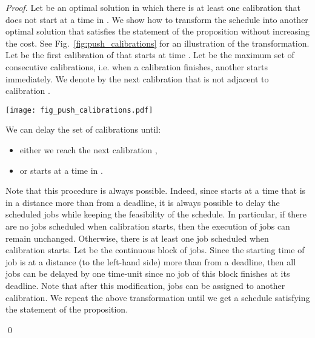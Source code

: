 \begin{proof}
Let  be an optimal solution in which there is at least one calibration that does not start at a time in .
We show how to transform the schedule  into another optimal
solution that satisfies the statement of the proposition without increasing the cost.
See Fig.~\ref{fig:push_calibrations} for an illustration of the transformation.
Let  be the first calibration of   that starts at
time .
Let  be the maximum set of consecutive calibrations, i.e.
when a calibration finishes, another starts immediately.
We denote by  the next calibration that is not adjacent to calibration .
\begin{figure*}[ht]
\centering
\texttt{[image: fig\_push\_calibrations.pdf]}
\caption{Illustration of Proposition~\ref{prop:position_calibration}. The first schedule is an optimal schedule. The second one is obtained after delaying the continuous 
block of calibrations .}
\label{fig:push_calibrations}
\end{figure*}
We can delay the set of calibrations  until:
\begin{itemize}
\item either we reach the next calibration ,
\item or  starts at a time in .
\end{itemize}
Note that this procedure is always possible.
Indeed, since  starts at a time that is in a distance more than  from a deadline, it is always possible to delay the scheduled jobs while keeping the feasibility of the schedule. 
In particular, if there are no jobs scheduled when calibration  starts, then the execution of jobs can remain unchanged.
Otherwise, there is at least one job scheduled when 
calibration  starts. Let   be the continuous block of jobs.
Since the starting time of job  is at a distance  (to the left-hand side) more than 
 from a deadline, then all  jobs
can be delayed by one time-unit since no job of this block finishes at its deadline.
Note that after this modification, jobs can be assigned to another calibration.
We repeat the above transformation until we get a schedule satisfying the
statement of the proposition.

\qed\end{proof}






